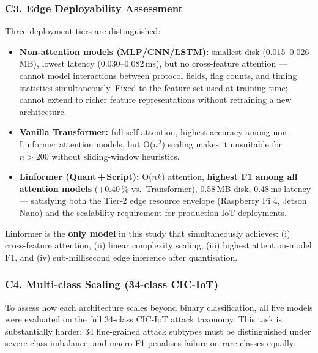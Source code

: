 \subsubsection{C3. Edge Deployability Assessment}

Three deployment tiers are distinguished:

\begin{itemize}[noitemsep]
  \item \textbf{Non-attention models (MLP/CNN/LSTM):} smallest disk
    (0.015--0.026\,MB), lowest latency (0.030--0.082\,ms), but no
    cross-feature attention — cannot model interactions between protocol
    fields, flag counts, and timing statistics simultaneously.
    Fixed to the feature set used at training time; cannot extend to
    richer feature representations without retraining a new architecture.
  \item \textbf{Vanilla Transformer:} full self-attention, highest
    accuracy among non-Linformer attention models, but O($n^2$) scaling
    makes it unsuitable for $n > 200$ without sliding-window heuristics.
  \item \textbf{Linformer (Quant\,+\,Script):} O($nk$) attention,
    \textbf{highest F1 among all attention models} (+0.40\,\% vs.\
    Transformer), 0.58\,MB disk, 0.48\,ms latency — satisfying both
    the Tier-2 edge resource envelope (Raspberry Pi 4, Jetson Nano)
    and the scalability requirement for production IoT deployments.
\end{itemize}

Linformer is the \textbf{only model} in this study that simultaneously
achieves: (i) cross-feature attention, (ii) linear complexity scaling,
(iii) highest attention-model F1, and (iv) sub-millisecond edge inference
after quantisation.

\subsubsection{C4. Multi-class Scaling (34-class CIC-IoT)}

To assess how each architecture scales beyond binary classification, all five
models were evaluated on the full 34-class CIC-IoT attack taxonomy.
This task is substantially harder: 34 fine-grained attack subtypes must be
distinguished under severe class imbalance, and macro F1 penalises failure on
rare classes equally.

